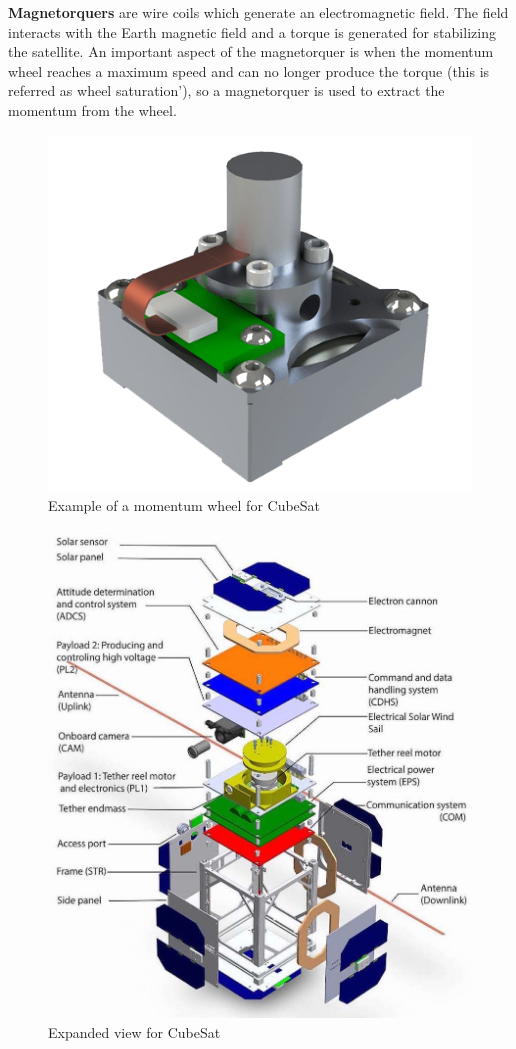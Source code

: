 \textbf{Magnetorquers} are wire coils which generate an electromagnetic field. The field interacts with the Earth magnetic field and a torque is generated for stabilizing the satellite. An important aspect of the magnetorquer is when the momentum wheel reaches a maximum speed and can no longer produce the torque (this is referred as wheel saturation'), so a magnetorquer is used to extract the momentum from the wheel.
\begin{table}[H]
	\begin{minipage}[b]{0.49\linewidth}
		\centering
		\begin{figure}[H]
			\centering
			\includegraphics[width=0.5\linewidth]{figures/MW}
			\caption{Example of a momentum wheel for CubeSat}
			\label{fig:MW}
		\end{figure}
	\end{minipage}\hfill
	\begin{minipage}[b]{0.49\linewidth}
		\centering
		\begin{figure}[H]
			\centering
			\includegraphics[width=1\linewidth]{figures/cubsat}
			\caption{Expanded view for CubeSat}
			\label{fig:cub}
		\end{figure}
	\end{minipage}
\end{table}
